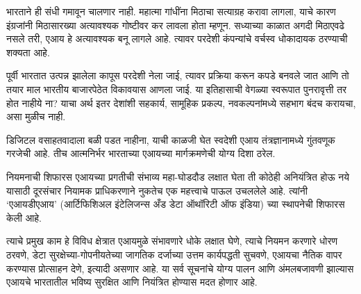 भारताने ही संधी गमावून चालणार नाही. महात्मा गांधींना मिठाचा सत्याग्रह करावा लागला, याचे कारण इंग्रजांनी मिठासारख्या अत्यावश्यक गोष्टीवर कर लावला होता म्हणून. सध्याच्या काळात अगदी मिठाएवढे नसले तरी, एआय हे अत्यावश्यक बनू लागले आहे. त्यावर परदेशी कंपन्यांचे वर्चस्व धोकादायक ठरण्याची शक्यता आहे.

पूर्वी भारतात उत्पन्न झालेला कापूस परदेशी नेला जाई, त्यावर प्रक्रिया करून कपडे बनवले जात आणि तो तयार माल भारतीय बाजारपेठेत विकावयास आणला जाई. या इतिहासाची वेगळ्या स्वरूपात पुनरावृत्ती तर होत नाहीये ना? याचा अर्थ इतर देशांशी सहकार्य, सामूहिक प्रकल्प, नवकल्पनांमध्ये सहभाग बंदच करायचा, असा मुळीच नाही.

डिजिटल वसाहतवादाला बळी पडत नाहीना, याची काळजी घेत स्वदेशी एआय तंत्रज्ञानामध्ये गुंतवणूक गरजेची आहे. तीच आत्मनिर्भर भारताच्या एआयच्या मार्गक्रमणेची योग्य दिशा ठरेल.

नियमनाची शिफारस
एआयच्या प्रगतीची संभाव्य महा-घोडदौड लक्षात घेता ती कोठेही अनियंत्रित होऊ नये यासाठी दूरसंचार नियामक प्राधिकरणाने नुकतेच एक महत्त्वाचे पाऊल उचललेले आहे. त्यांनी `एआयडीएआय' (आर्टिफिशिअल इंटेलिजन्स अँड डेटा ऑथॉरिटी ऑफ इंडिया) च्या स्थापनेची शिफारस केली आहे.

त्याचे प्रमुख काम हे विविध क्षेत्रात एआयमुळे संभावणारे धोके लक्षात घेणे, त्याचे नियमन करणारे धोरण ठरवणे, डेटा सुरक्षेच्या-गोपनीयतेच्या जागतिक दर्जाच्या उत्तम कार्यपद्धती सुचवणे, एआयचा नैतिक वापर करण्यास प्रोत्साहन देणे, इत्यादी असणार आहे. या सर्व सूचनांचे योग्य पालन आणि अंमलबजावणी झाल्यास एआयचे भारतातील भविष्य सुरक्षित आणि नियंत्रित होण्यास मदत होणार आहे.

